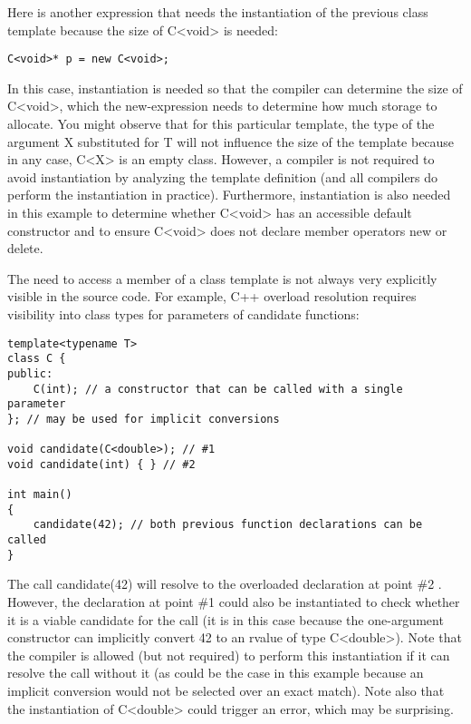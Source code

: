 Here is another expression that needs the instantiation of the previous class template because the size of C<void> is needed:

\begin{lstlisting}[style=styleCXX]
C<void>* p = new C<void>;
\end{lstlisting}

In this case, instantiation is needed so that the compiler can determine the size of C<void>, which the new-expression needs to determine how much storage to allocate. You might observe that for this particular template, the type of the argument X substituted for T will not influence the size of the template because in any case, C<X> is an empty class. However, a compiler is not required to avoid instantiation by analyzing the template definition (and all compilers do perform the instantiation in practice). Furthermore, instantiation is also needed in this example to determine whether C<void> has an accessible default constructor and to ensure C<void> does not declare member operators new or delete.

The need to access a member of a class template is not always very explicitly visible in the source code. For example, C++ overload resolution requires visibility into class types for parameters of candidate functions:

\begin{lstlisting}[style=styleCXX]
template<typename T>
class C {
public:
	C(int); // a constructor that can be called with a single parameter
}; // may be used for implicit conversions

void candidate(C<double>); // #1
void candidate(int) { } // #2

int main()
{
	candidate(42); // both previous function declarations can be called
}
\end{lstlisting}

The call candidate(42) will resolve to the overloaded declaration at point \#2 . However, the declaration at point \#1 could also be instantiated to check whether it is a viable candidate for the call (it is in this case because the one-argument constructor can implicitly convert 42 to an rvalue of type C<double>). Note that the compiler is allowed (but not required) to perform this instantiation if it can resolve the call without it (as could be the case in this example because an implicit conversion would not be selected over an exact match). Note also that the instantiation of C<double> could trigger an error, which may be surprising.




























